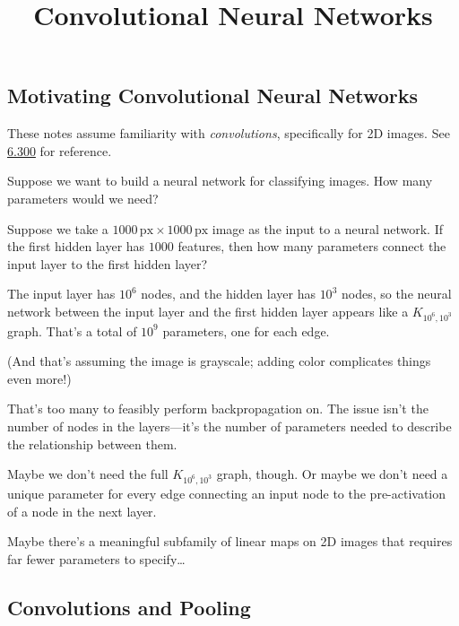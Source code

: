 \title{Convolutional Neural Networks}



\subsection{Motivating Convolutional Neural Networks}

\begin{remark}
    These notes assume familiarity with \emph{convolutions},
    specifically for 2D images.  See \href{/6.300/}{6.300} for reference.
\end{remark}

Suppose we want to build a neural network
for classifying images.
How many parameters would we need?

\begin{problem}
    Suppose we take a $1000\,\mathrm{px} \times 1000\,\mathrm{px}$ image
    as the input to a neural network.
    If the first hidden layer has $1000$ features,
    then how many parameters connect
    the input layer to the first hidden layer?
\end{problem}

\begin{solution}
    The input layer has $10^6$ nodes, and the hidden layer has $10^3$ nodes,
    so the neural network between the input layer and the first hidden layer
    appears like a $K_{10^6, 10^3}$ graph.
    That's a total of $\boxed{10^9}$ parameters, one for each edge.

    (And that's assuming the image is grayscale;
    adding color complicates things even more!)
\end{solution}

That's too many to feasibly perform backpropagation on.
The issue isn't the number of nodes in the layers---it's
the number of parameters needed to describe
the relationship between them.

Maybe we don't need the full $K_{10^6, 10^3}$ graph, though.
Or maybe we don't need a unique parameter for every edge
connecting an input node to
the pre-activation of a node in the next layer.

Maybe there's a meaningful subfamily of
linear maps on 2D images
that requires far fewer parameters to specify\dots

\subsection{Convolutions and Pooling}

